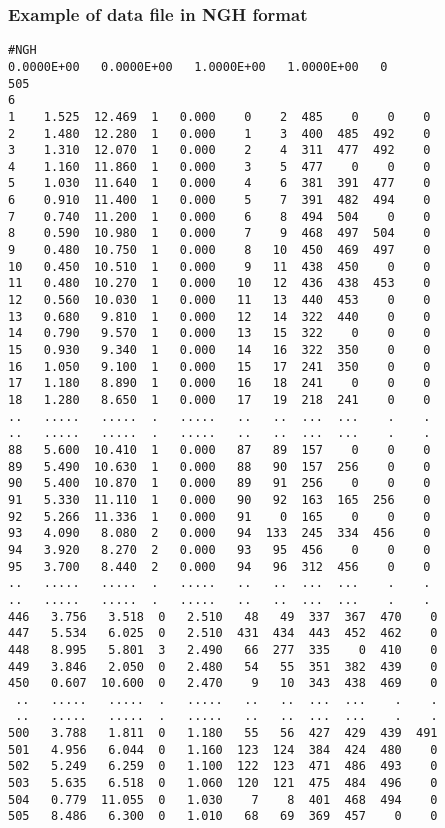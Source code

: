\documentclass{article}
\begin{document}
\subsubsection[Example of data file in NGH format]{Example of data file in NGH format}
\begin{small}
\begin{lstlisting}
#NGH
0.0000E+00   0.0000E+00   1.0000E+00   1.0000E+00   0
505
6
1    1.525  12.469  1   0.000    0    2  485    0    0    0
2    1.480  12.280  1   0.000    1    3  400  485  492    0
3    1.310  12.070  1   0.000    2    4  311  477  492    0
4    1.160  11.860  1   0.000    3    5  477    0    0    0
5    1.030  11.640  1   0.000    4    6  381  391  477    0
6    0.910  11.400  1   0.000    5    7  391  482  494    0
7    0.740  11.200  1   0.000    6    8  494  504    0    0
8    0.590  10.980  1   0.000    7    9  468  497  504    0
9    0.480  10.750  1   0.000    8   10  450  469  497    0
10   0.450  10.510  1   0.000    9   11  438  450    0    0
11   0.480  10.270  1   0.000   10   12  436  438  453    0
12   0.560  10.030  1   0.000   11   13  440  453    0    0
13   0.680   9.810  1   0.000   12   14  322  440    0    0
14   0.790   9.570  1   0.000   13   15  322    0    0    0
15   0.930   9.340  1   0.000   14   16  322  350    0    0
16   1.050   9.100  1   0.000   15   17  241  350    0    0
17   1.180   8.890  1   0.000   16   18  241    0    0    0
18   1.280   8.650  1   0.000   17   19  218  241    0    0
..   .....   .....  .   .....   ..   ..  ...  ...    .    .
..   .....   .....  .   .....   ..   ..  ...  ...    .    .
88   5.600  10.410  1   0.000   87   89  157    0    0    0
89   5.490  10.630  1   0.000   88   90  157  256    0    0
90   5.400  10.870  1   0.000   89   91  256    0    0    0
91   5.330  11.110  1   0.000   90   92  163  165  256    0
92   5.266  11.336  1   0.000   91    0  165    0    0    0
93   4.090   8.080  2   0.000   94  133  245  334  456    0
94   3.920   8.270  2   0.000   93   95  456    0    0    0
95   3.700   8.440  2   0.000   94   96  312  456    0    0
..   .....   .....  .   .....   ..   ..  ...  ...    .    .
..   .....   .....  .   .....   ..   ..  ...  ...    .    .
446   3.756   3.518  0   2.510   48   49  337  367  470    0
447   5.534   6.025  0   2.510  431  434  443  452  462    0
448   8.995   5.801  3   2.490   66  277  335    0  410    0
449   3.846   2.050  0   2.480   54   55  351  382  439    0
450   0.607  10.600  0   2.470    9   10  343  438  469    0
 ..   .....   .....  .   .....   ..   ..  ...  ...    .    .
 ..   .....   .....  .   .....   ..   ..  ...  ...    .    .
500   3.788   1.811  0   1.180   55   56  427  429  439  491
501   4.956   6.044  0   1.160  123  124  384  424  480    0
502   5.249   6.259  0   1.100  122  123  471  486  493    0
503   5.635   6.518  0   1.060  120  121  475  484  496    0
504   0.779  11.055  0   1.030    7    8  401  468  494    0
505   8.486   6.300  0   1.010   68   69  369  457    0    0
\end{lstlisting}
\end{small}
\end{document}

